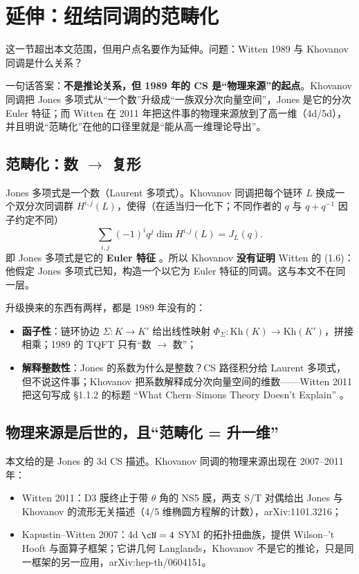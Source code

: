 \section{延伸：纽结同调的范畴化}
\label{sec:categorification}

这一节超出本文范围，但用户点名要作为延伸。问题：Witten 1989 与 Khovanov 同调是什么关系？

一句话答案：\textbf{不是推论关系，但 1989 年的 CS 是“物理来源”的起点}。Khovanov 同调把 Jones 多项式从“一个数”升级成“一族双分次向量空间”，Jones 是它的分次 Euler 特征；而 Witten 在 2011 年把这件事的物理来源放到了高一维（4d/5d），并且明说“范畴化”在他的口径里就是“能从高一维理论导出”。

\subsection{范畴化：数 $\to$ 复形}

Jones 多项式是一个数（Laurent 多项式）。Khovanov 同调把每个链环 $L$ 换成一个双分次同调群 $H^{i,j}(L)$，使得（在适当归一化下；不同作者的 $q$ 与 $q+q^{-1}$ 因子约定不同）
\begin{equation}
\sum_{i,j}(-1)^i q^j\dim H^{i,j}(L)=J_L(q).
\end{equation}
即 Jones 多项式是它的 \textbf{Euler 特征} \ours。所以 Khovanov \textbf{没有证明} Witten 的 (1.6)：他假定 Jones 多项式已知，构造一个以它为 Euler 特征的同调。这与本文不在同一层。

升级换来的东西有两样，都是 1989 年没有的：
\begin{itemize}[leftmargin=1.6em]
\item \textbf{函子性}：链环协边 $\Sigma:K\to K'$ 给出线性映射 $\Phi_\Sigma:\mathrm{Kh}(K)\to\mathrm{Kh}(K')$，拼接相乘；1989 的 TQFT 只有“数 $\to$ 数”；
\item \textbf{解释整数性}：Jones 的系数为什么是整数？CS 路径积分给 Laurent 多项式，但不说这件事；Khovanov 把系数解释成分次向量空间的维数——Witten 2011 把这句写成 §1.1.2 的标题 “What Chern--Simons Theory Doesn't Explain” 。
\end{itemize}

\subsection{物理来源是后世的，且“范畴化 = 升一维”}

本文给的是 Jones 的 3d CS 描述。Khovanov 同调的物理来源出现在 2007--2011 年：
\begin{itemize}[leftmargin=1.6em]
\item Witten 2011：D3 膜终止于带 $\theta$ 角的 NS5 膜，两支 S/T 对偶给出 Jones 与 Khovanov 的流形无关描述（4/5 维椭圆方程解的计数），arXiv:1101.3216；
\item Kapustin--Witten 2007：4d $\cN=4$ SYM 的拓扑扭曲族，提供 Wilson--'t Hooft 与面算子框架；它讲几何 Langlands，Khovanov 不是它的推论，只是同一框架的另一应用，arXiv:hep-th/0604151。
\end{itemize}

